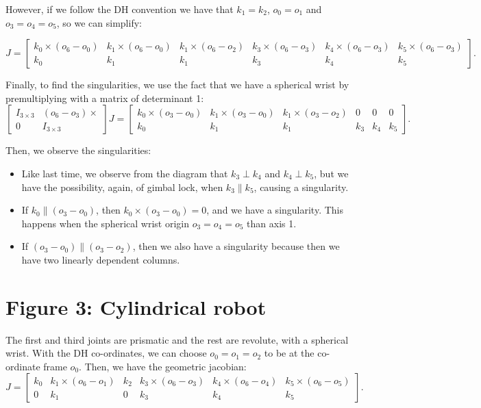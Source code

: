 \documentclass[11pt]{article}
\begin{document}
However, if we follow the DH convention we have that $k_1 = k_2$, $o_0 = o_1$ and $o_3 = o_4 = o_5$, so we can simplify:

\[
    J = \begin{bmatrix} k_0 \times (o_6 - o_0)  & k_1 \times (o_6 - o_0) &  k_1 \times (o_6 - o_2) &  k_3 \times (o_6 - o_3) & k_4 \times (o_6 - o_3) &  k_5 \times (o_6 - o_3) \\ k_0 & k_1 & k_1 & k_3 & k_4 & k_5 \end{bmatrix} 
.\] 


Finally, to find the singularities, we use the fact that we have a spherical wrist by premultiplying with a matrix of determinant 1:
\[
    \begin{bmatrix} I_{3 \times  3} & (o_6 - o_3) \times \\ 0 & I_{3 \times  3} \end{bmatrix}  J  = \begin{bmatrix} k_0 \times (o_3 - o_0)  & k_1 \times (o_3 - o_0) &  k_1 \times (o_3 - o_2) & 0 & 0 & 0  \\ k_0 & k_1 & k_1 & k_3 & k_4 & k_5 \end{bmatrix} 
.\] 

Then, we observe the singularities:
\begin{itemize}
    \item Like last time, we observe from the diagram that $k_3 \perp k_4$ and $k_4 \perp k_5$, but we have the possibility, again, of gimbal lock, when $k_3 \parallel k_5$, causing a singularity.
    \item If $k_0 \parallel (o_3 - o_0)$, then $k_0 \times (o_3 - o_0) = 0$, and we have a singularity. This happens when the spherical wrist origin $o_3=o_4=o_5$ than axis 1.
    \item If $(o_3 - o_0) \parallel (o_3 - o_2)$, then we also have a singularity because then we have two linearly dependent columns.
\end{itemize}

\section{Figure 3: Cylindrical robot}

The first and third joints are prismatic and the rest are revolute, with a spherical wrist.
With the DH co-ordinates, we can choose $o_0 = o_1 = o_2$ to be at the co-ordinate frame $o_0$.
Then, we have the geometric jacobian:
\[
    J = \begin{bmatrix} k_0 & k_1 \times (o_6 - o_1) & k_2 & k_3 \times (o_6 - o_3) & k_4 \times (o_6 - o_4) & k_5 \times (o_6 - o_5) \\ 0 & k_1 & 0 & k_3 & k_4 & k_5 \end{bmatrix} 
.\] 
\end{document}

